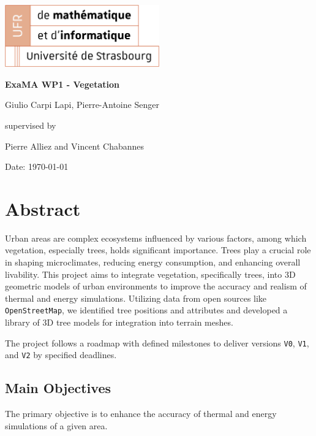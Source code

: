 \documentclass[12pt]{article}
\begin{document}
\begin{titlepage}
\centering
\includegraphics[width=0.5\textwidth]{images/logo_ufr.png}\par\vspace{1cm}
\vspace{1.5cm}
{\huge\bfseries ExaMA WP1 - Vegetation\par}
\vspace{2cm}
{\Large Giulio Carpi Lapi, Pierre-Antoine Senger\par}
\vfill
supervised by\par
Pierre Alliez and Vincent Chabannes

\vfill

{\large Date: \today\par}
\end{titlepage}

\tableofcontents
\newpage

\section{Abstract}
Urban areas are complex ecosystems influenced by various factors, among which 
vegetation, especially trees, holds significant importance. Trees play a crucial 
role in shaping microclimates, reducing energy consumption, and enhancing overall 
livability\cite{TIR4sTREEt}. This project aims to integrate vegetation, specifically trees, into 3D 
geometric models of urban environments to improve the accuracy and realism of thermal 
and energy simulations. Utilizing data from open sources like \texttt{OpenStreetMap},
we identified tree positions and attributes and developed a library of 3D tree
models for integration into terrain meshes.

The project follows a roadmap with defined milestones to deliver versions
\texttt{V0}, \texttt{V1}, and \texttt{V2} by specified  deadlines.

\subsection{Main Objectives}

The primary objective is to enhance the accuracy of thermal and energy
simulations of a given area.
\end{document}
